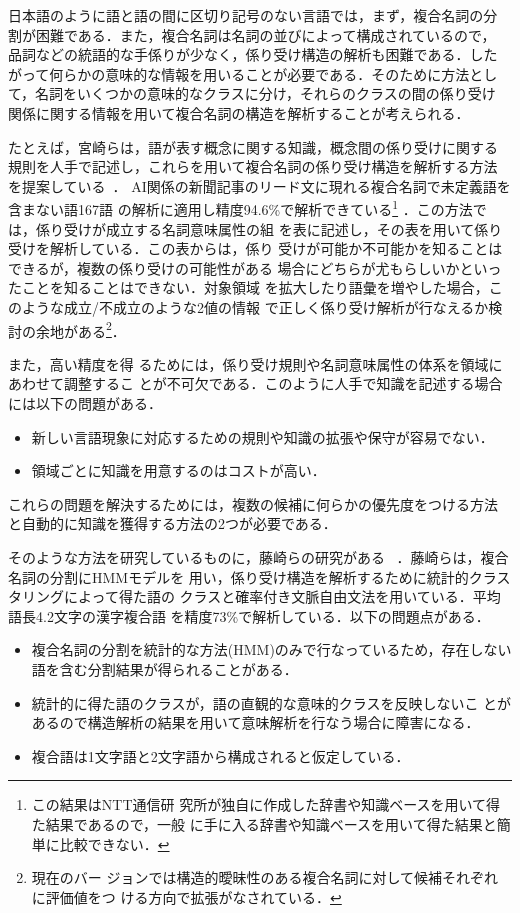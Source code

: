 日本語のように語と語の間に区切り記号のない言語では，まず，複合名詞の分
割が困難である．また，複合名詞は名詞の並びによって構成されているので，
品詞などの統語的な手係りが少なく，係り受け構造の解析も困難である．した
がって何らかの意味的な情報を用いることが必要である．そのために方法とし
て，名詞をいくつかの意味的なクラスに分け，それらのクラスの間の係り受け
関係に関する情報を用いて複合名詞の構造を解析することが考えられる．

たとえば，宮崎らは，語が表す概念に関する知識，概念間の係り受けに関する
規則を人手で記述し，これらを用いて複合名詞の係り受け構造を解析する方法
を提案している~\cite{miyazaki:84:a,miyazaki:93:a}．
AI関係の新聞記事のリード文に現れる複合名詞で未定義語を含まない語167語
の解析に適用し精度94.6\%で解析できている\footnote{この結果はNTT通信研
  究所が独自に作成した辞書や知識ベースを用いて得た結果であるので，一般
  に手に入る辞書や知識ベースを用いて得た結果と簡単に比較できない．}
\cite{miyazaki:93:a}．この方法では，係り受けが成立する名詞意味属性の組
を表に記述し，その表を用いて係り受けを解析している．この表からは，係り
受けが可能か不可能かを知ることはできるが，複数の係り受けの可能性がある
場合にどちらが尤もらしいかといったことを知ることはできない．対象領域
を拡大したり語彙を増やした場合，このような成立/不成立のような2値の情報
で正しく係り受け解析が行なえるか検討の余地がある\footnote{現在のバー
  ジョンでは構造的曖昧性のある複合名詞に対して候補それぞれに評価値をつ
  ける方向で拡張がなされている．}．

また，高い精度を得
るためには，係り受け規則や名詞意味属性の体系を領域にあわせて調整するこ
とが不可欠である．このように人手で知識を記述する場合には以下の問題がある．
  
\begin{itemize}
\item 新しい言語現象に対応するための規則や知識の拡張や保守が容易でない．
\item 領域ごとに知識を用意するのはコストが高い．
\end{itemize}

これらの問題を解決するためには，複数の候補に何らかの優先度をつける方法
と自動的に知識を獲得する方法の2つが必要である．

そのような方法を研究しているものに，藤崎らの研究がある~
\cite{nishino:88:a,takeda:87:a}．藤崎らは，複合名詞の分割にHMMモデルを
用い，係り受け構造を解析するために統計的クラスタリングによって得た語の
クラスと確率付き文脈自由文法を用いている．平均語長4.2文字の漢字複合語
を精度73\%で解析している．以下の問題点がある．
\begin{itemize}
\item 複合名詞の分割を統計的な方法(HMM)のみで行なっているため，存在しない
  語を含む分割結果が得られることがある．
\item 統計的に得た語のクラスが，語の直観的な意味的クラスを反映しないこ
とがあるので構造解析の結果を用いて意味解析を行なう場合に障害になる．
\item 複合語は1文字語と2文字語から構成されると仮定している．
\end{itemize}

